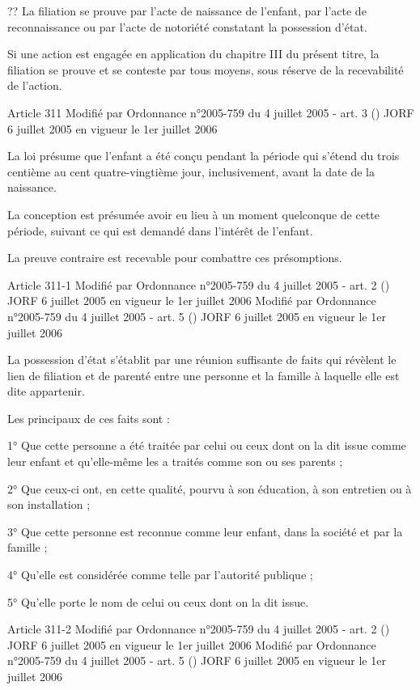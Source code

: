 \documentclass[
  12pt,
]{book}
\begin{document}
\begin{encadre}{??}
La filiation se prouve par l'acte de naissance de l'enfant, par l'acte de reconnaissance ou par l'acte de notoriété constatant la possession d'état.

Si une action est engagée en application du chapitre III du présent titre, la filiation se prouve et se conteste par tous moyens, sous réserve de la recevabilité de l'action.

Article 311
Modifié par Ordonnance n°2005-759 du 4 juillet 2005 - art. 3 () JORF 6 juillet 2005 en vigueur le 1er juillet 2006

La loi présume que l'enfant a été conçu pendant la période qui s'étend du trois centième au cent quatre-vingtième jour, inclusivement, avant la date de la naissance.

La conception est présumée avoir eu lieu à un moment quelconque de cette période, suivant ce qui est demandé dans l'intérêt de l'enfant.

La preuve contraire est recevable pour combattre ces présomptions.

Article 311-1
Modifié par Ordonnance n°2005-759 du 4 juillet 2005 - art. 2 () JORF 6 juillet 2005 en vigueur le 1er juillet 2006
Modifié par Ordonnance n°2005-759 du 4 juillet 2005 - art. 5 () JORF 6 juillet 2005 en vigueur le 1er juillet 2006

La possession d'état s'établit par une réunion suffisante de faits qui révèlent le lien de filiation et de parenté entre une personne et la famille à laquelle elle est dite appartenir.

Les principaux de ces faits sont :

1° Que cette personne a été traitée par celui ou ceux dont on la dit issue comme leur enfant et qu'elle-même les a traités comme son ou ses parents ;

2° Que ceux-ci ont, en cette qualité, pourvu à son éducation, à son entretien ou à son installation ;

3° Que cette personne est reconnue comme leur enfant, dans la société et par la famille ;

4° Qu'elle est considérée comme telle par l'autorité publique ;

5° Qu'elle porte le nom de celui ou ceux dont on la dit issue.

Article 311-2
Modifié par Ordonnance n°2005-759 du 4 juillet 2005 - art. 2 () JORF 6 juillet 2005 en vigueur le 1er juillet 2006
Modifié par Ordonnance n°2005-759 du 4 juillet 2005 - art. 5 () JORF 6 juillet 2005 en vigueur le 1er juillet 2006


\end{encadre}
\end{document}
